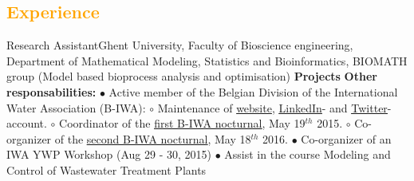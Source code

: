 \documentclass[11pt,a4paper,sans]{moderncv}
\title{}
\begin{document}
\makecvtitle

\colorbox{orange!10}{
	\begin{minipage}{\textwidth}
		\section{\textcolor{orange}{\textbf{Experience}}}
			{Research Assistant}{Ghent University, Faculty of Bioscience engineering, Department of Mathematical Modeling, Statistics and Bioinformatics, BIOMATH group (Model based bioprocess analysis and optimisation)}{}{}{}
			{\textbf{Projects} \small}
			{\textbf{Other responsabilities:}\newline \small 
			$\bullet$ Active member of the Belgian Division of the International Water Association (B-IWA):\newline
			$\circ$ Maintenance of \href{http://www.b-iwa.be}{website}, \href{https://www.linkedin.com/groups?mostRecent=&gid=3760023&trk=my_groups-tile-flipgrp}{\underline{LinkedIn}}- and \href{https://twitter.com/BelgianIWA}{\underline{Twitter}}-account.\newline
			$\circ$ Coordinator of the  \href{http://www.b-iwa.be/node/177}{\underline{first B-IWA nocturnal}}, May 19$^{th}$ 2015.
		}
		{\small
			$\circ$ Co-organizer of the  \href{http://www.b-iwa.be/biwa_nocturnal_coming}{\underline{second B-IWA nocturnal}}, May 18$^{th}$ 2016.\newline
			$\bullet$ Co-organizer of an IWA YWP Workshop (Aug 29 - 30, 2015)\newline
			$\bullet$ Assist in the course Modeling and Control of Wastewater Treatment Plants
		}
		
		\vspace{1.cm}
		

\end{minipage}}
\end{document}
